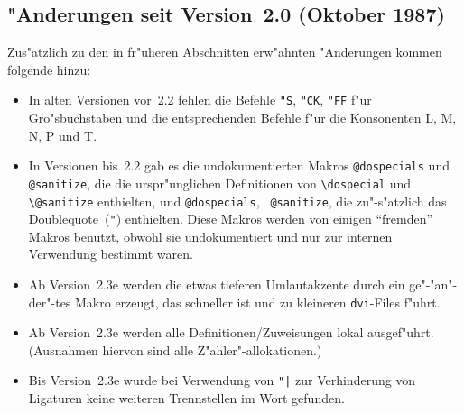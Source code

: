 \subsection{"Anderungen seit Version~2.0 (Oktober 1987)}

Zus"atzlich zu den in fr"uheren Abschnitten erw"ahnten
"Anderungen kommen folgende hinzu:

\begin{itemize}
\item In alten Versionen vor~2.2 fehlen die Befehle \verb:"S:,
  \verb:"CK:, \verb:"FF: f"ur Gro"sbuchstaben und die
  entsprechenden Befehle f"ur die Konsonenten L, M, N, P und T.
\item In Versionen bis~2.2 gab es die undokumentierten Makros
  {\tt \string\original\-@dospecials} und {\tt
  \string\original\-@sanitize}, die die urspr"unglichen
  Definitionen von \verb:\dospecial: und \verb:\@sanitize:
  enthielten, und {\tt \string\german\-@dospecials}, {\tt
  \string\german\-@sanitize}, die zu"-s"atzlich das
  Double\-quote~(\verb:":) enthielten. Diese Makros
  werden von einigen "`fremden"' Makros benutzt, obwohl sie
  undokumentiert und nur zur internen Verwendung bestimmt waren.
\item Ab Version~2.3e werden die etwas tieferen Umlautakzente
  durch ein ge"-"an"-der"-tes Makro erzeugt, das schneller ist
  und zu kleineren \verb:dvi:-Files f"uhrt.
\item Ab Version~2.3e werden alle Definitionen\slash Zuweisungen
  lokal aus\-ge\-f"uhrt. (Ausnahmen hiervon sind alle
  Z"ah\-ler"-allokationen.)
\item Bis Version~2.3e wurde bei Verwendung von \verb:"|: zur
  Verhinderung von Ligaturen keine weiteren Trennstellen im
  Wort gefunden.
\end{itemize}



